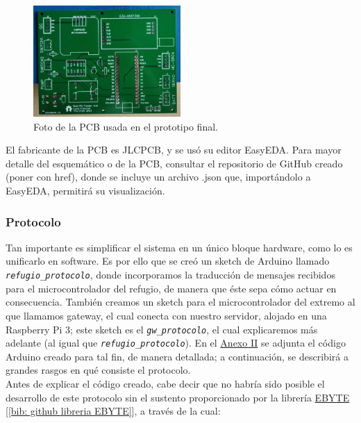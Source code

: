 \documentclass[12pt]{article}
\begin{document}
	\begin{figure}[h]
		\begin{center}
			\includegraphics[width=0.5\textwidth]{img/pcb_v1.1a.png}
			\caption{Foto de la PCB usada en el prototipo final.}
			\label{Foto PCB v1.1a}
		\end{center}
	\end{figure}
	
	\noindent El fabricante de la PCB es JLCPCB, y se usó su editor EasyEDA.  Para mayor detalle del esquemático o de la PCB, consultar el repositorio de GitHub creado (poner  con href), donde se incluye un archivo .json que, importándolo a EasyEDA, permitirá su visualización. \\
	
	\subsubsection{Protocolo}
	\noindent Tan importante es simplificar el sistema en un único bloque hardware, como lo es unificarlo en software. Es por ello que se creó un sketch de Arduino llamado \texttt{\textit{refugio\_protocolo}}, donde incorporamos la traducción de mensajes recibidos para el microcontrolador del refugio, de manera que éste sepa cómo actuar en consecuencia. También creamos un sketch para el microcontrolador del extremo al que llamamos gateway, el cual conecta con nuestro servidor, alojado en una Raspberry Pi 3; este sketch es el \texttt{\textit{gw\_protocolo}}, el cual explicaremos más adelante (al igual que \texttt{\textit{refugio\_protocolo}}).  En el \hyperref[anexo II: codigo]{Anexo II}  se adjunta el código Arduino creado para tal fin, de manera detallada; a continuación, se describirá a grandes rasgos en qué consiste el protocolo.\\
	
	\noindent Antes de explicar el código creado, cabe decir que no habría sido posible el desarrollo de este protocolo sin el sustento proporcionado por la librería \href{https://github.com/KrisKasprzak/EBYTE}{EBYTE} [\ref{bib: github libreria EBYTE}], a través de la cual:
	
\end{document}
